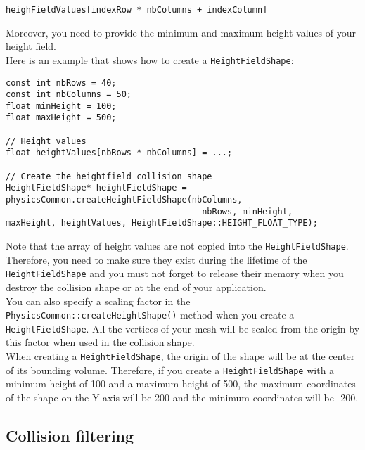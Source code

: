 \documentclass[a4paper,12pt]{article}
\begin{document}
  \begin{lstlisting}
heighFieldValues[indexRow * nbColumns + indexColumn]
  \end{lstlisting}

  \vspace{0.6cm}

  Moreover, you need to provide the minimum and maximum height values of your height field. \\

  Here is an example that shows how to create a \texttt{HeightFieldShape}: \\

  \begin{lstlisting}
const int nbRows = 40;
const int nbColumns = 50;
float minHeight = 100;
float maxHeight = 500;

// Height values
float heightValues[nbRows * nbColumns] = ...;

// Create the heightfield collision shape
HeightFieldShape* heightFieldShape = physicsCommon.createHeightFieldShape(nbColumns,
  							           nbRows, minHeight,
maxHeight, heightValues, HeightFieldShape::HEIGHT_FLOAT_TYPE);
  \end{lstlisting}

  \vspace{0.6cm}

  Note that the array of height values are not copied into the \texttt{HeightFieldShape}. Therefore, you need to make sure
  they exist during the lifetime of the \texttt{HeightField\allowbreak Shape} and you must not forget to release their memory when you
  destroy the collision shape or at the end of your application. \\

  You can also specify a scaling factor in the \texttt{PhysicsCommon::createHeightShape()} method  when you create a \texttt{Height\allowbreak FieldShape}.
  All the vertices of your mesh will be scaled from the origin by this factor when used in the collision shape. \\

  When creating a \texttt{HeightFieldShape}, the origin of the shape will be at the center of its bounding volume.
  Therefore, if you create a \texttt{HeightFieldShape} with a minimum height of 100 and a maximum height of 500, the
  maximum coordinates of the shape on the Y axis will be 200 and the minimum coordinates will be -200.

    \subsection{Collision filtering}
    \label{sec:collisionfiltering}
\end{document}
